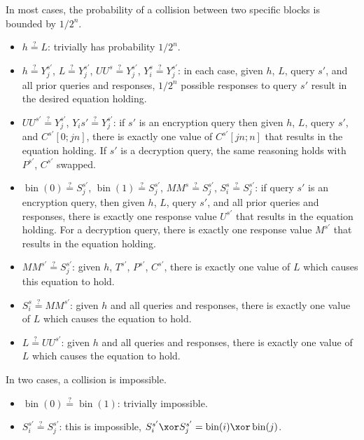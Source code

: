 \documentclass[letterpaper,11pt]{article}
\newcommand*{\MM}{\mathit{MM}}
\newcommand*{\qeq}{\stackrel{\text{?}}{=}}
\newcommand*{\UU}{\mathit{UU}}
\DeclareMathOperator{\fromint}{bin}
\begin{document}
In most cases, the probability of a collision
between two specific blocks is bounded by \(1/2^n\).

\begin{itemize}
    \item \(h \qeq L\): trivially has probability \(1/2^n\).
    \item
    \(h \qeq Y_j^{s'}\),
    \(L \qeq Y_j^{s'}\),
    \(\UU^s \qeq Y_j^{s'}\),
    \(Y_i^s \qeq Y_j^{s'}\):
    in each case, given \(h\), \(L\), query \(s'\), 
    and all prior queries and responses, 
    \(1/2^n\) possible responses to query \(s'\)
    result in the desired equation holding.
    \item
    \(\UU^{s'} \qeq Y_j^{s'}\), 
    \(Y_i{s'} \qeq Y_j^{s'}\): 
    if \(s'\) is an encryption query
    then given \(h\), \(L\), query \(s'\), and 
    \(C^{s'}[0;jn]\), there is exactly one value of
    \(C^{s'}[jn;n]\) that results in the equation holding.
    If \(s'\) is a decryption query, the same reasoning holds
    with \(P^{s'}\), \(C^{s'}\) swapped.
    \item 
    \(\fromint(0) \qeq S_j^{s'}\),
    \(\fromint(1) \qeq S_j^{s'}\),
    \(\MM^s \qeq S_j^{s'}\),
    \(S_i^s \qeq S_j^{s'}\):
    if query \(s'\) is an encryption query,
    then given \(h\), \(L\), query \(s'\), 
    and all prior queries and responses,
    there is exactly one response value \(U^{s'}\)
    that results in the equation holding.
    For a decryption query, 
    there is exactly one response value \(M^{s'}\)
    that results in the equation holding.
    \item
    \(\MM^{s'} \qeq S_j^{s'}\):
    given \(h\), \(T^{s'}\), \(P^{s'}\), \(C^{s'}\),
    there is exactly one value of \(L\)
    which causes this equation to hold.
    \item 
    \(S_i^s \qeq \MM^{s'}\):
    given \(h\) and all queries and responses,
    there is exactly one value of \(L\)
    which causes the equation to hold.
    \item \(L \qeq \UU^{s'}\):
    given \(h\) and all queries and responses,
    there is exactly one value of \(L\)
    which causes the equation to hold.
\end{itemize}

In two cases, a collision is impossible.

\begin{itemize}
    \item \(\fromint(0) \qeq \fromint(1)\): trivially impossible.
    \item 
    \(S_i^{s'} \qeq S_j^{s'}\):
    this is impossible, 
    \(S_i^{s'} \xor S_j^{s'} = \fromint(i) \xor \fromint(j)\).
\end{itemize}
\end{document}
